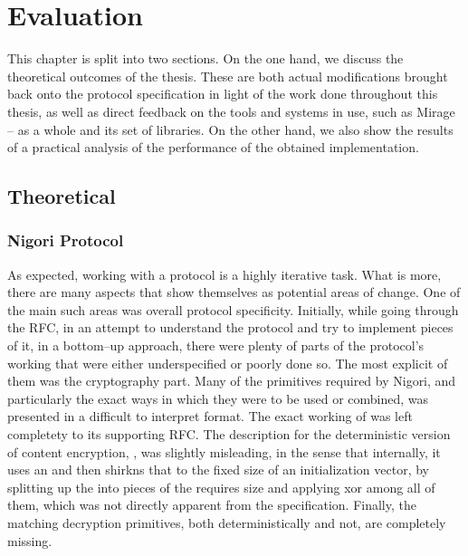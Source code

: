\chapter{Evaluation} \label{chapter:evaluation}
This chapter is split into two sections.
On the one hand, we discuss the theoretical outcomes of the thesis.
These are both actual modifications brought back onto the protocol specification in light of the work done throughout this thesis, as well as direct feedback on the tools and systems in use, such as Mirage -- as a whole and its set of libraries.
On the other hand, we also show the results of a practical analysis of the performance of the obtained implementation.

\section{Theoretical}
\subsection{Nigori Protocol}
As expected, working with a \wip protocol is a highly iterative task.
What is more, there are many aspects that show themselves as potential areas of change.
One of the main such areas was overall protocol specificity.
Initially, while going through the RFC, in an attempt to understand the protocol and try to implement pieces of it, in a bottom--up approach, there were plenty of parts of the protocol's working that were either underspecified or poorly done so.
The most explicit of them was the cryptography part.
Many of the primitives required by Nigori, and particularly the exact ways in which they were to be used or combined, was presented in a difficult to interpret format.
The exact working of  was left completety to its supporting RFC.
The description for the deterministic version of content encryption, , was slightly misleading, in the sense that internally, it uses an  and then shirkns that to the fixed size of an  initialization vector, by splitting up the  into pieces of the requires size and applying xor among all of them, which was not directly apparent from the specification.
Finally, the matching decryption primitives, both deterministically and not, are completely missing.

